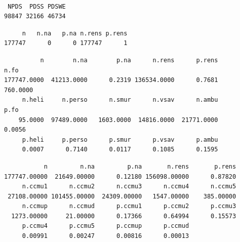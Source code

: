 \documentclass[]{article}
\newenvironment{Shaded}{\begin{snugshade}}{\end{snugshade}}
\newcommand{\KeywordTok}[1]{\textcolor[rgb]{0.13,0.29,0.53}{\textbf{{#1}}}}
\newcommand{\CommentTok}[1]{\textcolor[rgb]{0.56,0.35,0.01}{\textit{{#1}}}}
\newcommand{\NormalTok}[1]{{#1}}
\begin{document}
\begin{verbatim}

 NPDS  PDSS PDSWE 
98847 32166 46734 
\end{verbatim}

\begin{Shaded}
\end{Shaded}

\begin{verbatim}
     n   n.na   p.na n.rens p.rens 
177747      0      0 177747      1 
\end{verbatim}

\begin{Shaded}
\end{Shaded}

\begin{verbatim}
          n        n.na        p.na      n.rens      p.rens        n.fo 
177747.0000  41213.0000      0.2319 136534.0000      0.7681    760.0000 
     n.heli     n.perso      n.smur      n.vsav      n.ambu        p.fo 
    95.0000  97489.0000   1603.0000  14816.0000  21771.0000      0.0056 
     p.heli     p.perso      p.smur      p.vsav      p.ambu 
     0.0007      0.7140      0.0117      0.1085      0.1595 
\end{verbatim}

\begin{Shaded}
\end{Shaded}

\begin{verbatim}
           n         n.na         p.na       n.rens       p.rens 
177747.00000  21649.00000      0.12180 156098.00000      0.87820 
     n.ccmu1      n.ccmu2      n.ccmu3      n.ccmu4      n.ccmu5 
 27108.00000 101455.00000  24309.00000   1547.00000    385.00000 
     n.ccmup      n.ccmud      p.ccmu1      p.ccmu2      p.ccmu3 
  1273.00000     21.00000      0.17366      0.64994      0.15573 
     p.ccmu4      p.ccmu5      p.ccmup      p.ccmud 
     0.00991      0.00247      0.00816      0.00013 
\end{verbatim}
\end{document}
